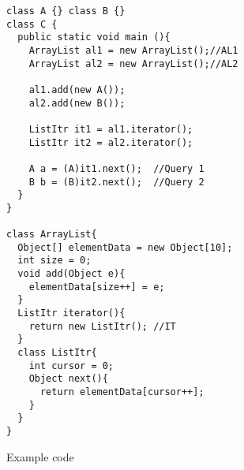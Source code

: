 %
\begin{figure}
\begin{subfigure}[b]{.9\columnwidth}
\begin{multicols}{2}
\centering
\begin{lstlisting}
class A {} class B {}
class C {
  public static void main (){
    ArrayList al1 = new ArrayList();//AL1
    ArrayList al2 = new ArrayList();//AL2

    al1.add(new A());
    al2.add(new B());

    ListItr it1 = al1.iterator();
    ListItr it2 = al2.iterator();

    A a = (A)it1.next();  //Query 1
    B b = (B)it2.next();  //Query 2
  }
}

class ArrayList{
  Object[] elementData = new Object[10];
  int size = 0;
  void add(Object e){
    elementData[size++] = e;
  }
  ListItr iterator(){
    return new ListItr(); //IT
  }
  class ListItr{
    int cursor = 0;
    Object next(){
      return elementData[cursor++];
    }
  }
}
\end{lstlisting}
\end{multicols}
\caption{Example code}
\label{fig:obj:code}
\end{subfigure}
\begin{multicols}{2}
\begin{subfigure}[b]{.9\columnwidth}
\begin{center}
\end{center}
\end{subfigure}
\end{multicols}
\end{figure}
